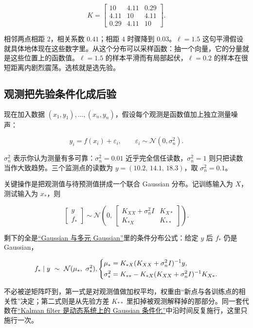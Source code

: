 \[
K=
\begin{bmatrix}
10 & 4.11 & 0.29\\
4.11 & 10 & 4.11\\
0.29 & 4.11 & 10
\end{bmatrix}.
\]

相邻两点相距 \(2\)，相关系数 \(0.41\)；相距 \(4\) 时骤降到 \(0.03\)。\(\ell=1.5\) 这句平滑假设就具体地体现在这些数字里。从这个分布可以采样函数：抽一个向量，它的分量就是这些位置上的函数值。\(\ell=1.5\) 的样本平滑而有局部起伏，\(\ell=0.2\) 的样本在很短距离内剧烈震荡。选核就是选先验。

\subsection{观测把先验条件化成后验}

现在加入数据 \((x_1,y_1),\dots,(x_n,y_n)\)，假设每个观测是函数值加上独立测量噪声：

\[
y_i=f(x_i)+\varepsilon_i,\qquad\varepsilon_i\sim\mathcal{N}(0,\sigma_n^2).
\]

\(\sigma_n^2\) 表示你认为测量有多可靠：\(\sigma_n^2=0.01\) 近乎完全信任读数，\(\sigma_n^2=1\) 则只把读数当作大致趋势。三个监测点的读数为 \(y=(10.2,\,14.1,\,18.3)\)，取 \(\sigma_n^2=0.1\)。

关键操作是把观测值与待预测值拼成一个联合 Gaussian 分布。记训练输入为 \(X\)，测试输入为 \(x_*\)，则

\[
\begin{bmatrix}y\\ f_*\end{bmatrix}
\sim\mathcal{N}\left(
0,\
\begin{bmatrix}
K_{XX}+\sigma_n^2 I & K_{X*}\\
K_{*X} & K_{**}
\end{bmatrix}
\right).
\]

剩下的全是\hyperref[sec:05-Probability/06-Common-Distributions/05]{``Gaussian 与多元 Gaussian''}里的条件分布公式：给定 \(y\) 后 \(f_*\) 仍是 Gaussian，

\[
f_*\given y\ \sim\ \mathcal{N}(\mu_*,\ \sigma_*^2),
\qquad
\left\{
\begin{aligned}
\mu_*&=K_{*X}(K_{XX}+\sigma_n^2I)^{-1}y,\\
\sigma_*^2&=K_{**}-K_{*X}(K_{XX}+\sigma_n^2I)^{-1}K_{X*}.
\end{aligned}
\right.
\]

不必被逆矩阵吓到，第一式是对观测值做加权平均，权重由``新点与各训练点的相关性''决定；第二式则是从先验方差 \(K_{**}\) 里扣掉被观测解释掉的那部分。同一套代数在\hyperref[sec:13-Machine-Learning/07-Graphical-and-Sequential-Models/03]{``Kalman filter 是动态系统上的 Gaussian 条件化''}中沿时间反复施行，这里只施行一次。

